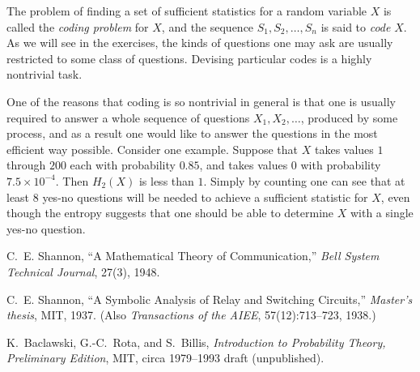 \documentclass{report}
\begin{document}
The problem of finding a set of sufficient statistics for a random variable \( X \) is called the \emph{coding problem} for \( X \), and the sequence \( S_1, S_2, \ldots, S_n \) is said to \emph{code} \( X \). As we will see in the exercises, the kinds of questions one may ask are usually restricted to some class of questions. Devising particular codes is a highly nontrivial task.

One of the reasons that coding is so nontrivial in general is that one is usually required to answer a whole sequence of questions \( X_1, X_2, \ldots \), produced by some process, and as a result one would like to answer the questions in the most efficient way possible. Consider one example. Suppose that \( X \) takes values \( 1 \) through \( 200 \) each with probability \( 0.85 \), and takes values \( 0 \) with probability \( 7.5 \times 10^{-4} \). Then \( H_2(X) \) is less than \( 1 \). Simply by counting one can see that at least \( 8 \) yes-no questions will be needed to achieve a sufficient statistic for \( X \), even though the entropy suggests that one should be able to determine \( X \) with a single yes-no question.

\vspace{1em}
\begin{thebibliography}{9}
C.~E. Shannon,
\newblock ``A Mathematical Theory of Communication,''
\newblock \emph{Bell System Technical Journal}, 27(3), 1948.

C.~E. Shannon,
\newblock ``A Symbolic Analysis of Relay and Switching Circuits,''
\newblock \emph{Master's thesis}, MIT, 1937. (Also \emph{Transactions of the AIEE}, 57(12):713--723, 1938.)

K.~Baclawski, G.-C.~Rota, and S.~Billis,
\newblock \emph{Introduction to Probability Theory, Preliminary Edition},
\newblock MIT, circa 1979--1993 draft (unpublished).

\end{thebibliography}
\end{document}
